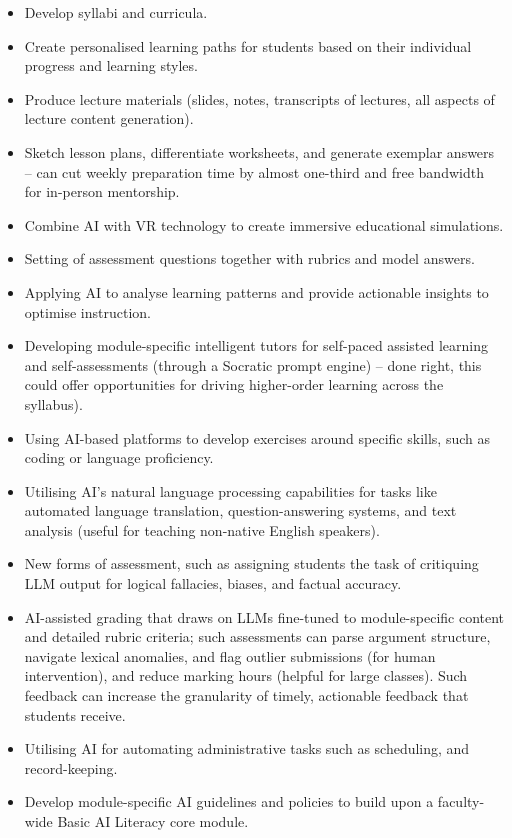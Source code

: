 \documentclass[
  10t,
]{article}
\providecommand{\tightlist}{%
  \setlength{\itemsep}{0pt}\setlength{\parskip}{0pt}}
\begin{document}
\begin{itemize}
\tightlist
\item
  Develop syllabi and curricula.
\item
  Create personalised learning paths for students based on their
  individual progress and learning styles.
\item
  Produce lecture materials (slides, notes, transcripts of lectures, all
  aspects of lecture content generation).
\item
  Sketch lesson plans, differentiate worksheets, and generate exemplar
  answers -- can cut weekly preparation time by almost one-third and
  free bandwidth for in-person mentorship.
\item
  Combine AI with VR technology to create immersive educational
  simulations.
\item
  Setting of assessment questions together with rubrics and model
  answers.
\item
  Applying AI to analyse learning patterns and provide actionable
  insights to optimise instruction.
\item
  Developing module-specific intelligent tutors for self-paced assisted
  learning and self-assessments (through a Socratic prompt engine) --
  done right, this could offer opportunities for driving higher-order
  learning across the syllabus).
\item
  Using AI-based platforms to develop exercises around specific skills,
  such as coding or language proficiency.
\item
  Utilising AI's natural language processing capabilities for tasks like
  automated language translation, question-answering systems, and text
  analysis (useful for teaching non-native English speakers).
\item
  New forms of assessment, such as assigning students the task of
  critiquing LLM output for logical fallacies, biases, and factual
  accuracy.
\item
  AI-assisted grading that draws on LLMs fine-tuned to module-specific
  content and detailed rubric criteria; such assessments can parse
  argument structure, navigate lexical anomalies, and flag outlier
  submissions (for human intervention), and reduce marking hours
  (helpful for large classes). Such feedback can increase the
  granularity of timely, actionable feedback that students receive.
\item
  Utilising AI for automating administrative tasks such as scheduling,
  and record-keeping.
\item
  Develop module-specific AI guidelines and policies to build upon a
  faculty-wide Basic AI Literacy core module.
\end{itemize}
\end{document}
